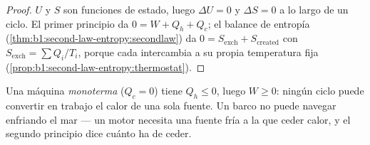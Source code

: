 \begin{proof}
$U$ y $S$ son funciones de estado, luego $\Delta U = 0$ y $\Delta S = 0$ a
lo largo de un ciclo. El primer principio da $0 = W + Q_h + Q_c$; el
balance de entropía (\cref{thm:b1:second-law-entropy:secondlaw}) da $0 = S_{\mathrm{exch}} +
S_{\mathrm{created}}$ con $S_{\mathrm{exch}} = \sum Q_i/T_i$, porque cada
 intercambia a su propia temperatura fija
(\cref{prop:b1:second-law-entropy:thermostat}).
\end{proof}

\begin{corollary}\label{cor:b1:heat-engines:kelvin}
Una máquina \emph{monoterma} ($Q_c = 0$) tiene $Q_h \leq 0$, luego $W \geq 0$:
ningún ciclo puede convertir en trabajo el calor de una sola fuente. Un
barco no puede navegar enfriando el mar --- un motor necesita una fuente
fría a la que ceder calor, y el segundo principio dice cuánto ha de ceder.
\end{corollary}

